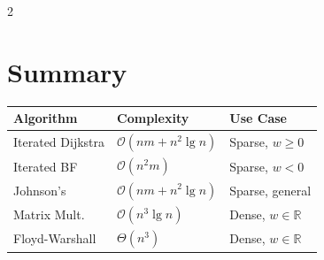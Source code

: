 \documentclass[10pt, a4paper]{article}
\newcommand{\BigO}[1]{\mathcal{O}(#1)}
\newcommand{\ThetaO}[1]{\Theta(#1)}
\theoremstyle{compact}
\begin{document}
\begin{multicols*}{2}
\section{Summary}
\begin{center}
\renewcommand{\arraystretch}{1.2}
\begin{tabular}{|l|l|l|}
\hline
\textbf{Algorithm} & \textbf{Complexity} & \textbf{Use Case} \\
\hline
Iterated Dijkstra & $\BigO{nm + n^2 \lg n}$ & Sparse, $w \ge 0$ \\
Iterated BF & $\BigO{n^2 m}$ & Sparse, $w < 0$ \\
Johnson's & $\BigO{nm + n^2 \lg n}$ & Sparse, general \\
Matrix Mult. & $\BigO{n^3 \lg n}$ & Dense, $w \in \mathbb{R}$ \\
Floyd-Warshall & $\ThetaO{n^3}$ & Dense, $w \in \mathbb{R}$ \\
\hline
\end{tabular}
\end{center}

\end{multicols*}
\end{document}
